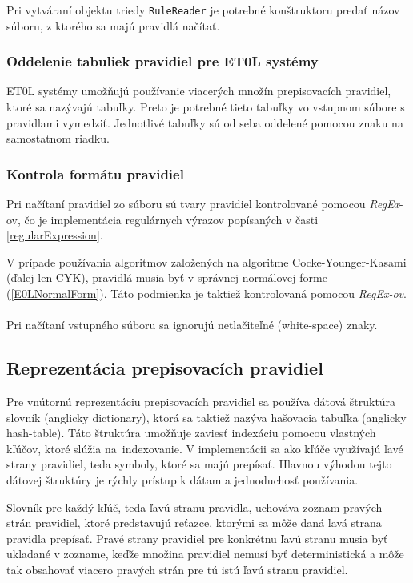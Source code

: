 Pri vytváraní objektu triedy \texttt{RuleReader} je potrebné konštruktoru predať názov súboru, z ktorého sa majú pravidlá načítať.

\subsubsection*{Oddelenie tabuliek pravidiel pre ET0L systémy}
ET0L systémy umožňujú používanie viacerých množín prepisovacích pravidiel, ktoré sa nazývajú tabuľky. Preto je potrebné tieto tabuľky vo vstupnom súbore s pravidlami vymedziť. Jednotlivé tabuľky sú od seba oddelené pomocou znaku \textbf{\uv{\#}} na samostatnom riadku.

\subsubsection*{Kontrola formátu pravidiel}
Pri načítaní pravidiel zo súboru sú tvary pravidiel kontrolované pomocou \textit{RegEx}-ov, čo je implementácia regulárnych výrazov popísaných v časti \ref{regularExpression}.

V prípade používania algoritmov založených na algoritme Cocke-Younger-Kasami (ďalej len CYK), pravidlá musia byť v správnej normálovej forme (\ref{E0LNormalForm}). Táto podmienka je taktiež kontrolovaná pomocou \textit{RegEx-ov}.
\\\\
Pri načítaní vstupného súboru sa ignorujú netlačiteľné (white-space) znaky.

\subsection*{Reprezentácia prepisovacích pravidiel}
Pre vnútornú reprezentáciu prepisovacích pravidiel sa používa dátová štruktúra slovník (anglicky dictionary), ktorá sa taktiež nazýva hašovacia tabuľka (anglicky hash-table). Táto štruktúra umožňuje zaviesť indexáciu pomocou vlastných kľúčov, ktoré slúžia na~indexovanie. V implementácii sa ako kľúče využívajú ľavé strany pravidiel, teda symboly, ktoré sa majú prepísať. Hlavnou výhodou tejto dátovej štruktúry je rýchly prístup k dátam a jednoduchosť používania.

Slovník pre každý kľúč, teda ľavú stranu pravidla, uchováva zoznam pravých strán pravidiel, ktoré predstavujú reťazce, ktorými sa môže daná ľavá strana pravidla prepísať. Pravé strany pravidiel pre konkrétnu ľavú stranu musia byť ukladané v zozname, keďže množina pravidiel nemusí byť deterministická a môže tak obsahovať viacero pravých strán pre tú istú ľavú stranu pravidiel.

